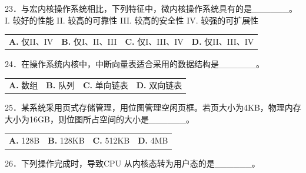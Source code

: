 \documentclass[UTF8,11pt]{ctexart}
\begin{document}
23．与宏内核操作系统相比，下列特征中，微内核操作系统具有的是\_\_\_\_\_\_。 I. 较好的性能 II. 较高的可靠性 III. 较高的安全性 IV. 较强的可扩展性


\begin{center}\begin{tabular}{>{\raggedright\arraybackslash}p{\dimexpr(\linewidth-8\tabcolsep)/4\relax}>{\raggedright\arraybackslash}p{\dimexpr(\linewidth-8\tabcolsep)/4\relax}>{\raggedright\arraybackslash}p{\dimexpr(\linewidth-8\tabcolsep)/4\relax}>{\raggedright\arraybackslash}p{\dimexpr(\linewidth-8\tabcolsep)/4\relax}}
\textbf{A.} 仅II、IV & \textbf{B.} 仅I、II、III & \textbf{C.} 仅I、III、IV & \textbf{D.} 仅II、III、IV\\[.35em]\end{tabular}\end{center}

24．在操作系统内核中，中断向量表适合采用的数据结构是\_\_\_\_\_\_。


\begin{center}\begin{tabular}{>{\raggedright\arraybackslash}p{\dimexpr(\linewidth-8\tabcolsep)/4\relax}>{\raggedright\arraybackslash}p{\dimexpr(\linewidth-8\tabcolsep)/4\relax}>{\raggedright\arraybackslash}p{\dimexpr(\linewidth-8\tabcolsep)/4\relax}>{\raggedright\arraybackslash}p{\dimexpr(\linewidth-8\tabcolsep)/4\relax}}
\textbf{A.} 数组 & \textbf{B.} 队列 & \textbf{C.} 单向链表 & \textbf{D.} 双向链表\\[.35em]\end{tabular}\end{center}

25．某系统采用页式存储管理，用位图管理空闲页框。若页大小为4KB，物理内存大小为16GB，则位图所占空间的大小是\_\_\_\_\_\_。


\begin{center}\begin{tabular}{>{\raggedright\arraybackslash}p{\dimexpr(\linewidth-8\tabcolsep)/4\relax}>{\raggedright\arraybackslash}p{\dimexpr(\linewidth-8\tabcolsep)/4\relax}>{\raggedright\arraybackslash}p{\dimexpr(\linewidth-8\tabcolsep)/4\relax}>{\raggedright\arraybackslash}p{\dimexpr(\linewidth-8\tabcolsep)/4\relax}}
\textbf{A.} 128B & \textbf{B.} 128KB & \textbf{C.} 512KB & \textbf{D.} 4MB\\[.35em]\end{tabular}\end{center}

26．下列操作完成时，导致CPU 从内核态转为用户态的是\_\_\_\_\_\_。
\end{document}
